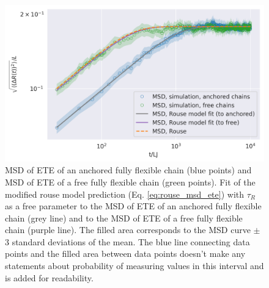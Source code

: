 \documentclass[
    paper=A4,pagesize=automedia,fontsize=12pt,
    BCOR=15mm,DIV=22,
    twoside,headinclude,footinclude=false,
    fleqn,             %
    bibliography=totocnumbered,          %
    listof=totoc,                %
    listof=flat,                 %
    cleardoublepage=empty      %
    numbers=endperiod
]{scrartcl}
\begin{document}
\begin{figure}[h]
    \begin{center}
      \includegraphics[width=\columnwidth,trim={0cm 0cm 0cm 0.8cm},clip]{3-exp-free-param-log.png}
      \caption{\label{fig:anchored_flex_chain_vs_rouse_fitted}
      MSD of ETE of an anchored fully flexible chain (blue points) and 
      MSD of ETE of a free fully flexible chain (green points).
      Fit of the modified 
      rouse model prediction 
      (Eq. \ref{eq:rouse_msd_ete}) with $\tau_R$ as a free parameter to the 
      MSD of ETE of an anchored fully flexible chain (grey line) and 
      to the MSD of ETE of a free fully flexible chain (purple line).
      The filled area corresponds to the MSD curve $\pm$ 
      3 standard deviations of the mean. The
      blue line connecting data points and the filled area between data points doesn't make
      any statements about probability of measuring values in this interval and is
      added for readability.
      }
    \end{center}
\end{figure}
\end{document}
